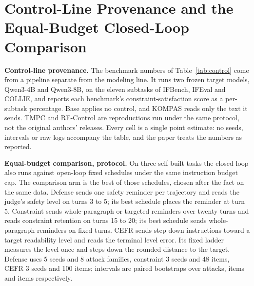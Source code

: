 \section{Control-Line Provenance and the Equal-Budget Closed-Loop Comparison}
\label{app:A4_equal_cost}

\textbf{Control-line provenance.} The benchmark numbers of Table~\ref{tab:control} come from a pipeline separate from the modeling line.  %
It runs two frozen target models, Qwen3-4B and Qwen3-8B, on the eleven subtasks of IFBench, IFEval and COLLIE, and reports each benchmark's constraint-satisfaction score as a per-subtask percentage.  %
Base applies no control, and KOMPAS reads only the text it sends.
TMPC and RE-Control are reproductions run under the same protocol, not the original authors' releases.  %
Every cell is a single point estimate: no seeds, intervals or raw logs accompany the table, and the paper treats the numbers as reported.

\textbf{Equal-budget comparison, protocol.} On three self-built tasks the closed loop also runs against open-loop fixed schedules under the same instruction budget cap.
The comparison arm is the best of those schedules, chosen after the fact on the same data.  %
Defense sends one safety reminder per trajectory and reads the judge's safety level on turns 3 to 5; its best schedule places the reminder at turn 5.  %
Constraint sends whole-paragraph or targeted reminders over twenty turns and reads constraint retention on turns 15 to 20; its best schedule sends whole-paragraph reminders on fixed turns.  %
CEFR sends step-down instructions toward a target readability level and reads the terminal level error.
Its fixed ladder measures the level once and steps down the rounded distance to the target.  %
Defense uses 5 seeds and 8 attack families, constraint 3 seeds and 48 items, CEFR 3 seeds and 100 items; intervals are paired bootstraps over attacks, items and items respectively.  %

